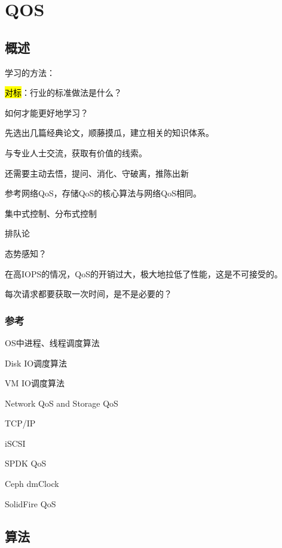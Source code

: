 \chapter{QOS}

\section{概述}

学习的方法：
\begin{enumbox}
\item \hl{对标}：行业的标准做法是什么？
\item 如何才能更好地学习？
\item *
\item 先选出几篇经典论文，顺藤摸瓜，建立相关的知识体系。
\item 与专业人士交流，获取有价值的线索。
\item 还需要主动去悟，提问、消化、守破离，推陈出新
\end{enumbox}

参考网络QoS，存储QoS的核心算法与网络QoS相同。

集中式控制、分布式控制

排队论

态势感知？

在高IOPS的情况，QoS的开销过大，极大地拉低了性能，这是不可接受的。

每次请求都要获取一次时间，是不是必要的？

\subsection{参考}

\begin{enumbox}
\item OS中进程、线程调度算法
\item Disk IO调度算法
\item VM IO调度算法
\item Network QoS and Storage QoS
\item TCP/IP
\item iSCSI
\item SPDK QoS
\item Ceph dmClock
\item SolidFire QoS
\end{enumbox}

\section{算法}

